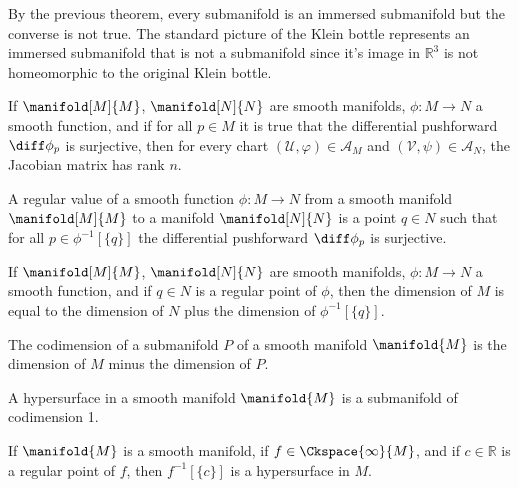         By the previous theorem, every submanifold is an immersed
        submanifold but the converse is not true. The standard picture of
        the Klein bottle represents an immersed submanifold that is not a
        submanifold since it's image in $\mathbb{R}^{3}$ is not homeomorphic
        to the original Klein bottle.
        \begin{theorem}
            If $\manifold[M]{M}$, $\manifold[N]{N}$ are smooth manifolds,
            $\phi:M\rightarrow{N}$ a smooth function, and if for all
            $p\in{M}$ it is true that the differential pushforward
            $\diff\phi_{p}$ is surjective, then for every chart
            $(\mathcal{U},\varphi)\in\mathcal{A}_{M}$ and
            $(\mathcal{V},\psi)\in\mathcal{A}_{N}$, the Jacobian matrix has
            rank $n$.
        \end{theorem}
        \begin{definition}
            A regular value of a smooth function $\phi:M\rightarrow{N}$ from
            a smooth manifold $\manifold[M]{M}$ to a manifold
            $\manifold[N]{N}$ is a point $q\in{N}$ such that for all
            $p\in\phi^{\minus{1}}[\{q\}]$ the differential pushforward
            $\diff\phi_{p}$ is surjective.
        \end{definition}
        \begin{theorem}
            If $\manifold[M]{M}$, $\manifold[N]{N}$ are smooth manifolds,
            $\phi:M\rightarrow{N}$ a smooth function, and if $q\in{N}$ is a
            regular point of $\phi$, then the dimension of $M$ is equal to
            the dimension of $N$ plus the dimension of
            $\phi^{\minus{1}}[\{q\}]$.
        \end{theorem}
        \begin{definition}
            The codimension of a submanifold $P$ of a smooth manifold
            $\manifold{M}$ is the dimension of $M$ minus the dimension of
            $P$.
        \end{definition}
        \begin{definition}
            A hypersurface in a smooth manifold $\manifold{M}$ is a
            submanifold of codimension 1.
        \end{definition}
        \begin{theorem}
            If $\manifold{M}$ is a smooth manifold, if
            $f\in\Ckspace{\infty}{M}$, and if $c\in\mathbb{R}$ is a regular
            point of $f$, then $f^{\minus{1}}[\{c\}]$ is a hypersurface in
            $M$.
        \end{theorem}
